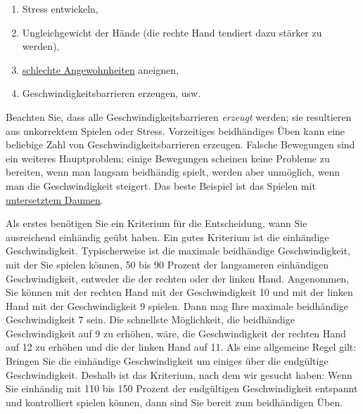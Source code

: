 \begin{enumerate}[label={\arabic*.}] 
 \item Stress entwickeln,
 \item Ungleichgewicht der Hände (die rechte Hand tendiert dazu stärker zu werden),
 \item \hyperref[c1ii22]{schlechte Angewohnheiten} aneignen,
 \item Geschwindigkeitsbarrieren erzeugen, usw.
 \end{enumerate}

Beachten Sie, dass alle Geschwindigkeitsbarrieren \textit{erzeugt} werden; sie resultieren aus unkorrektem Spielen oder Stress.
Vorzeitiges beidhändiges Üben kann eine beliebige Zahl von Geschwindigkeitsbarrieren erzeugen.
Falsche Bewegungen sind ein weiteres Hauptproblem; einige Bewegungen scheinen keine Probleme zu bereiten, wenn man langsam beidhändig spielt, werden aber unmöglich, wenn man die Geschwindigkeit steigert.
Das beste Beispiel ist das Spielen mit \hyperref[c1iii5a]{untersetztem Daumen}.

Als erstes benötigen Sie ein Kriterium für die Entscheidung, wann Sie ausreichend einhändig geübt haben.
Ein gutes Kriterium ist die einhändige Geschwindigkeit.
Typischerweise ist die maximale beidhändige Geschwindigkeit, mit der Sie spielen können, 50 bis 90 Prozent der langsameren einhändigen Geschwindigkeit, entweder die der rechten oder der linken Hand.
Angenommen, Sie können mit der rechten Hand mit der Geschwindigkeit 10 und mit der linken Hand mit der Geschwindigkeit 9 spielen.
Dann mag Ihre maximale beidhändige Geschwindigkeit 7 sein.
Die schnellste Möglichkeit, die beidhändige Geschwindigkeit auf 9 zu erhöhen, wäre, die Geschwindigkeit der rechten Hand auf 12 zu erhöhen und die der linken Hand auf 11.
Als eine allgemeine Regel gilt: Bringen Sie die einhändige Geschwindigkeit um einiges über die endgültige Geschwindigkeit.
Deshalb ist das Kriterium, nach dem wir gesucht haben: Wenn Sie einhändig mit 110 bis 150 Prozent der endgültigen Geschwindigkeit entspannt und kontrolliert spielen können, dann sind Sie bereit zum beidhändigen Üben.


\hypertarget{notenweise}{}

